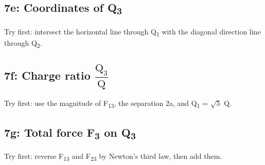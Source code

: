 \documentclass[11pt]{article}
\begin{document}
\begin{keepsection}
\begin{keepsection}
\subsection{7e: Coordinates of Q\textsubscript{3}}

Try first: intersect the horizontal line through Q\textsubscript{1} with the diagonal direction line through Q\textsubscript{2}.

\end{keepsection}

\begin{keepsection}
\subsection{7f: Charge ratio {\small\ensuremath{\dfrac{\mathrm{Q}_{3}}{\mathrm{Q}}}}}

Try first: use the magnitude of F\textsubscript{13}, the separation 2a, and Q\textsubscript{1} = \ensuremath{\sqrt{5}} Q.

\end{keepsection}

\begin{keepsection}
\subsection{7g: Total force F\textsubscript{3} on Q\textsubscript{3}}

Try first: reverse F\textsubscript{13} and F\textsubscript{23} by Newton’s third law, then add them.

\end{keepsection}
\end{keepsection}


\clearpage
\end{document}
